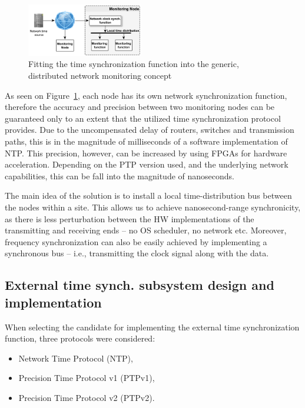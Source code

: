 \documentclass[journal]{IEEEtran}
\begin{document}
\begin{figure}[!htb]
    \centering
    \includegraphics[width=0.45\textwidth]{figures_raw/concept.png}
    \caption{Fitting the time synchronization function into the generic, distributed network monitoring concept}
    \label{fig:concept}
\end{figure}

As seen on Figure~\ref{fig:concept}, each node has its own network synchronization function, therefore the accuracy and
precision between two monitoring nodes can be guaranteed only to an extent that the utilized time synchronization
protocol provides. Due to the uncompensated delay of routers, switches and transmission paths, this is in the magnitude of milliseconds of a software implementation of NTP. This precision, however, can be increased by using FPGAs for hardware acceleration. Depending on the PTP version used, and the underlying network capabilities, this can be fall into the magnitude of nanoseconds.

The main idea of the solution is to install a local time-distribution bus between the nodes within a site. This allows us to achieve nanosecond-range synchronicity, as there is
less perturbation between the HW implementations of the transmitting and receiving ends -- no OS scheduler, no network etc. Moreover, frequency synchronization can also be easily achieved by implementing a synchronous bus -- i.e., transmitting
the
clock signal along with the data.

\subsection{External time synch. subsystem design and implementation}\label{sec:External-Impl}

When selecting the candidate for implementing the external time synchronization function, three protocols were considered:
\begin{itemize}
    \item Network Time Protocol (NTP),
    \item Precision Time Protocol v1 (PTPv1),
    \item Precision Time Protocol v2 (PTPv2).
\end{itemize}
\end{document}
